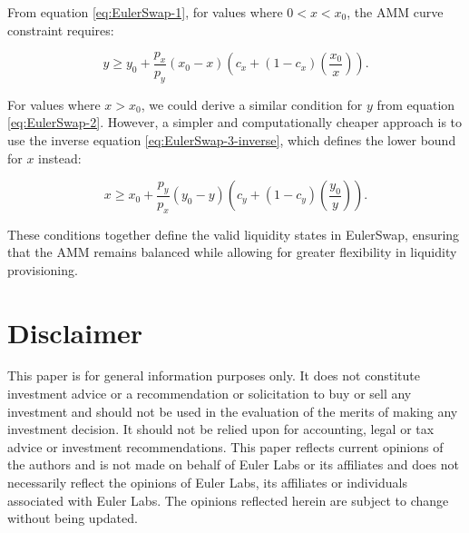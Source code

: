 \documentclass{article}
\begin{document}
From equation \eqref{eq:EulerSwap-1}, for values where \( 0 < x < x_0 \), the AMM curve constraint requires:

\begin{equation}
    \label{eq:invariant-x1}
    y \geq y_{0}+\frac{p_{x}}{p_{y}}\left(x_{0}-x\right)\left(c_{x}+\left(1-c_{x}\right)\left(\frac{x_{0}}{x}\right)\right).
\end{equation}

For values where \( x > x_0 \), we could derive a similar condition for $y$ from equation \eqref{eq:EulerSwap-2}. However, a simpler and computationally cheaper approach is to use the inverse equation \eqref{eq:EulerSwap-3-inverse}, which defines the lower bound for $x$ instead:

\begin{equation}
    \label{eq:invariant-x2}
    x \geq x_{0}+\frac{p_{y}}{p_{x}}\left(y_{0}-y\right)\left(c_{y}+\left(1-c_{y}\right)\left(\frac{y_{0}}{y}\right)\right).
\end{equation}

These conditions together define the valid liquidity states in EulerSwap, ensuring that the AMM remains balanced while allowing for greater flexibility in liquidity provisioning.

\section{Disclaimer}

This paper is for general information purposes only. It does not constitute investment
advice or a recommendation or solicitation to buy or sell any investment and should not
be used in the evaluation of the merits of making any investment decision. It should not
be relied upon for accounting, legal or tax advice or investment recommendations. This
paper reflects current opinions of the authors and is not made on behalf of Euler Labs or its
affiliates and does not necessarily reflect the opinions of Euler Labs, its affiliates or individuals
associated with Euler Labs. The opinions reflected herein are subject to change without being
updated.
\end{document}
